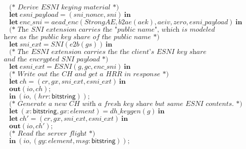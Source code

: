 \documentclass{article}
\theoremstyle{definition}
\newcommand{\kwl}[1]{\mathbf{#1}}
\newcommand{\kwt}[1]{\mathsf{#1}}
\newcommand{\var}[1]{\mathit{#1}}
\theoremstyle{definition}
\begin{document}
\begin{tabbing}
$ $\\
$\ \ \ \ \ \textit{(* Derive ESNI keying material *)} $\\
$\ \ \ \ \ \kwl{let}\ \var{esni{\_}payload} = (\var{sni{\_}nonce}, \var{sni})\ \kwl{in} $\\
$\ \ \ \ \ \kwl{let}\ \var{enc{\_}sni} = \var{aead{\_}enc}(\var{StrongAE}, \var{b2ae}(\var{aek}), \var{aeiv}, \var{zero}, \var{esni{\_}payload})\ \kwl{in} $\\
$ $\\
$\ \ \ \ \ \textit{(* The SNI extension carries the "public name", which is modeled }$\\
$\textit{        here as the public key share of the public name *)} $\\
$\ \ \ \ \ \kwl{let}\ \var{sni{\_}ext} = \var{SNI}(\var{e2b}(\var{gs}))\ \kwl{in} $\\
$ $\\
$\ \ \ \ \ \textit{(* The ESNI extension carries the the client's ESNI key share}$\\
$\textit{        and the encrypted SNI payload *)} $\\
$\ \ \ \ \ \kwl{let}\ \var{esni{\_}ext} = \var{ESNI}(\var{g}, \var{gc}, \var{enc{\_}sni})\ \kwl{in} $\\
$ $\\
$\ \ \ \ \ \textit{(* Write out the CH and get a HRR in response *)} $\\
$\ \ \ \ \ \kwl{let}\ \var{ch} = (\var{cr}, \var{gx}, \var{sni{\_}ext}, \var{esni{\_}ext})\ \kwl{in} $\\
$\ \ \ \ \ \kwl{out}(\var{io}, \var{ch}); $\\
$ $\\
$\ \ \ \ \ \kwl{in}\ (\var{io}, (\var{hrr}{:}\kwt{bitstring})); $\\
$ $\\
$\ \ \ \ \ \textit{(* Generate a new CH with a fresh key share but same ESNI contents. *)} $\\
$\ \ \ \ \ \kwl{let}\ (\var{x}{:}\kwt{bitstring}, \var{gx}{:}\var{element}) = \var{dh{\_}keygen}(\var{g})\ \kwl{in} $\\
$\ \ \ \ \ \kwl{let}\ \var{ch'} = (\var{cr}, \var{gx}, \var{sni{\_}ext}, \var{esni{\_}ext})\ \kwl{in} $\\
$\ \ \ \ \ \kwl{out}(\var{io}, \var{ch'}); $\\
$ $\\
$\ \ \ \ \ \textit{(* Read the server flight *)} $\\
$\ \ \ \ \ \kwl{in}\ (\var{io}, (\var{gy}{:}\var{element}, \var{msg}{:}\kwt{bitstring})); $\\

\end{tabbing}
\end{document}
